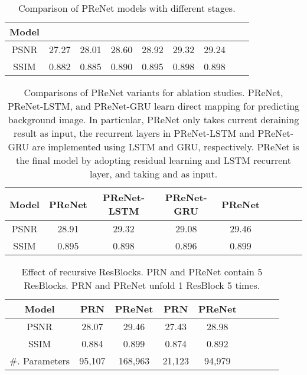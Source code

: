 \documentclass[10pt,twocolumn,letterpaper]{article}
\begin{document}
\begin{table*}[!htb]\small
	\caption{Comparison of PReNet models with different  stages.  }
	\setlength{\tabcolsep}{4pt}
	\centering
	\begin{tabular}{c|cccccccc}
		\hline
		
		\hline
		Model &  &  &  &  &  &  \\
		\hline
		PSNR       & 27.27   &  28.01    &  28.60     &  28.92 & 29.32 &29.24            \\
		SSIM       & 0.882   & 0.885     &  0.890     &  0.895  &0.898 &0.898            \\
		\hline
		
		\hline
	\end{tabular}
	\label{table:ablation stages}
\end{table*}


\begin{table}[!htb]\small
	\caption{Comparisons of PReNet variants for ablation studies. 
PReNet, PReNet-LSTM, and PReNet-GRU learn direct mapping for predicting background image. 
In particular, PReNet only takes current deraining result  as input, the recurrent layers in PReNet-LSTM and PReNet-GRU are implemented using LSTM and GRU, respectively.
PReNet is the final model by adopting residual learning and LSTM recurrent layer, and taking  and  as input. }
	\centering
	\setlength{\tabcolsep}{4pt}
	\begin{tabular}{c|c|cc|ccccc}
		\hline
		
		\hline
		Model      &  PReNet    &  PReNet-LSTM & PReNet-GRU  & PReNet  \\
		\hline
		PSNR       & 28.91    & 29.32        &  29.08         &  29.46         \\
		SSIM       & 0.895    & 0.898        &  0.896        &  0.899        \\
		\hline
		
		\hline
	\end{tabular}
	\label{table:ablation more}
\end{table}

\begin{table}[!htb]\small
	\caption{Effect of recursive ResBlocks. PRN and PReNet contain 5 ResBlocks. PRN and PReNet unfold 1 ResBlock 5 times. }
	\centering
	\setlength{\tabcolsep}{8pt}
	\begin{tabular}{c|cc|cccccc}
		\hline
		
		\hline
		Model          &  PRN & PReNet &  PRN & PReNet  \\
		\hline
		PSNR           & 28.07&  29.46 &  27.43   & 28.98     \\
		SSIM           & 0.884&  0.899 &  0.874    & 0.892    \\
		\hline
\#. Parameters    & 95,107& 168,963& 21,123    &  94,979 \\
		
\hline
		
		\hline
	\end{tabular}
	\label{table:ablation variants}
\end{table}
\end{document}
